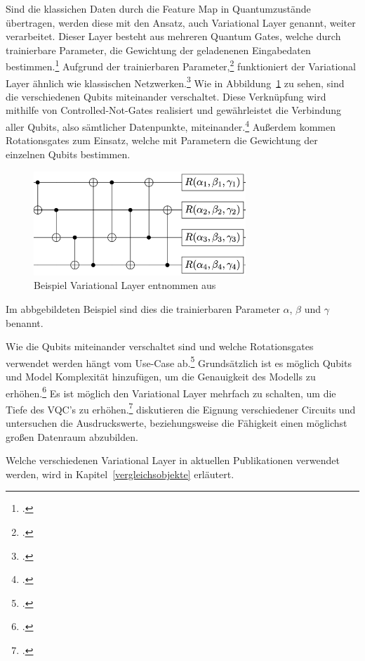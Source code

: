 Sind die klassichen Daten durch die Feature Map in Quantumzustände übertragen, werden diese mit den Ansatz, auch Variational Layer genannt, weiter verarbeitet.
Dieser Layer besteht aus mehreren Quantum Gates, welche durch trainierbare Parameter, die Gewichtung der geladenenen Eingabedaten bestimmen.\footcite[Vgl.][S. 2]{Hu2022}
Aufgrund der trainierbaren Parameter,\footcite[Vgl.renote][S. 3]{Cao2023} funktioniert der Variational Layer ähnlich wie klassischen Netzwerken.\footcite[Vgl.][S. 414]{Kwak2021}
Wie in Abbildung~\ref{abb:varlayer} zu sehen, sind die verschiedenen Qubits miteinander verschaltet. Diese Verknüpfung wird mithilfe von Controlled-Not-Gates realisiert und gewährleistet die Verbindung aller Qubits, also sämtlicher Datenpunkte, miteinander.\footcite[Vgl.][S. 4]{Yu2023} 
Außerdem kommen Rotationsgates zum Einsatz, welche mit Parametern die Gewichtung der einzelnen Qubits bestimmen. 

\begin{figure}[htb]
    \centering
    \includegraphics[width=8cm]{lib/graphics/varlayer.png}
    \caption[Beispiel Variational Layer]{Beispiel Variational Layer entnommen aus~\cite[][S. 7]{Chen2022}}
    \label{abb:varlayer}
\end{figure}

Im abbgebildeten Beispiel sind dies die trainierbaren Parameter $\alpha$, $\beta$ und $\gamma$ benannt.

Wie die Qubits miteinander verschaltet sind und welche Rotationsgates verwendet werden hängt vom Use-Case ab.\footcite[Vgl.][]{Yu2023,Chen2022,Cao2023,Sim2019}
Grundsätzlich ist es möglich Qubits und Model Komplexität hinzufügen, um die Genauigkeit des Modells zu erhöhen.\footcite[Vgl.][S. 2]{Cao2023}
Es ist möglich den Variational Layer mehrfach zu schalten, um die Tiefe des \ac{VQC}'s zu erhöhen.\footcite[Vgl.][S. 9]{Chen2022}
\cite[][S. 8]{Sim2019} diskutieren die Eignung verschiedener Circuits und untersuchen die Ausdruckswerte, beziehungsweise die Fähigkeit einen möglichst großen Datenraum abzubilden.




Welche verschiedenen Variational Layer in aktuellen Publikationen verwendet werden, wird in Kapitel~\ref{vergleichsobjekte} erläutert.


